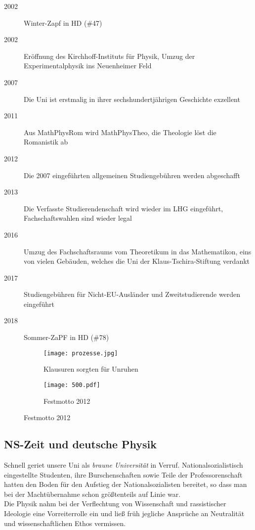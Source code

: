 \begin{description}
\item[2002] Winter-Zapf in HD (\#47)
\item[2002] Eröffnung des Kirchhoff-Instituts für Physik, Umzug der Experimentalphysik ins Neuenheimer Feld
\item[2007] Die Uni ist erstmalig in ihrer sechshundertjährigen Geschichte exzellent
\item[2011] Aus MathPhysRom wird MathPhysTheo, die Theologie löst die Romanistik ab
\item[2012] Die 2007 eingeführten allgemeinen Studiengebühren werden abgeschafft
\item[2013] Die Verfasste Studierendenschaft wird wieder im LHG eingeführt, Fachschaftswahlen sind wieder legal
\item[2016] Umzug des Fachschaftsraums vom Theoretikum in das Mathematikon, eins von vielen Gebäuden, welches die Uni der Klaus-Tschira-Stiftung verdankt
\item[2017] Studiengebühren für Nicht-EU-Ausländer und Zweitstudierende werden eingeführt
\item[2018] Sommer-ZaPF in HD (\#78)
\end{description}

\begin{figure}[t]
\captionsetup[subfigure]{labelformat=empty} 
\begin{subfigure}{0.5\textwidth}
\centering
\texttt{[image: prozesse.jpg]} 
\caption{Klausuren sorgten für Unruhen}
\end{subfigure}
\begin{subfigure}{0.5\textwidth}
\centering
\texttt{[image: 500.pdf]}
\caption{Festmotto 2012}
\end{subfigure}
\end{figure}


\subsection*{NS-Zeit und deutsche Physik}


Schnell geriet unsere Uni als \textit{braune Universität} in Verruf. Nationalsozialistisch eingestellte Studenten, ihre Burschenschaften sowie Teile der Professorenschaft hatten den Boden für den Aufstieg der Nationalsozialisten bereitet, so dass man bei der Machtübernahme schon größtenteils auf Linie war.\\
Die Physik nahm bei der Verflechtung von Wissenschaft und rassistischer Ideologie eine Vorreiterrolle ein und ließ früh jegliche Ansprüche an Neutralität und wissenschaftlichen Ethos vermissen.

